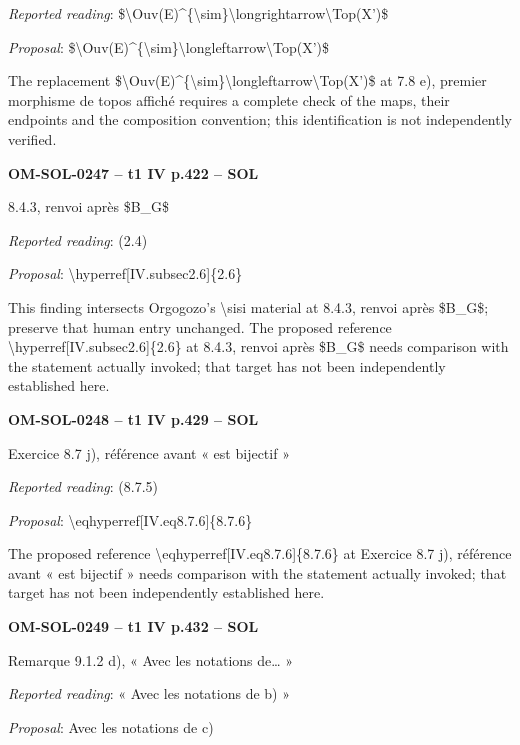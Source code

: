 \emph{Reported reading}: \$\textbackslash{}Ouv(E)\textasciicircum{}\{\textbackslash{}sim\}\textbackslash{}longrightarrow\textbackslash{}Top(X')\$\par
\emph{Proposal}: \$\textbackslash{}Ouv(E)\textasciicircum{}\{\textbackslash{}sim\}\textbackslash{}longleftarrow\textbackslash{}Top(X')\$\par
The replacement \$\textbackslash{}Ouv(E)\textasciicircum{}\{\textbackslash{}sim\}\textbackslash{}longleftarrow\textbackslash{}Top(X')\$ at 7.8 e), premier morphisme de topos affiché requires a complete check of the maps, their endpoints and the composition convention; this identification is not independently verified.\par
\par\noindent\textbf{OM-SOL-0247 -- t1 IV p.422 -- SOL}\par
8.4.3, renvoi après \$B\_G\$\par
\emph{Reported reading}: (2.4)\par
\emph{Proposal}: \textbackslash{}hyperref[IV.subsec2.6]\{2.6\}\par
This finding intersects Orgogozo's \textbackslash{}sisi material at 8.4.3, renvoi après \$B\_G\$; preserve that human entry unchanged. The proposed reference \textbackslash{}hyperref[IV.subsec2.6]\{2.6\} at 8.4.3, renvoi après \$B\_G\$ needs comparison with the statement actually invoked; that target has not been independently established here.\par
\par\noindent\textbf{OM-SOL-0248 -- t1 IV p.429 -- SOL}\par
Exercice 8.7 j), référence avant « est bijectif »\par
\emph{Reported reading}: (8.7.5)\par
\emph{Proposal}: \textbackslash{}eqhyperref[IV.eq8.7.6]\{8.7.6\}\par
The proposed reference \textbackslash{}eqhyperref[IV.eq8.7.6]\{8.7.6\} at Exercice 8.7 j), référence avant « est bijectif » needs comparison with the statement actually invoked; that target has not been independently established here.\par
\par\noindent\textbf{OM-SOL-0249 -- t1 IV p.432 -- SOL}\par
Remarque 9.1.2 d), « Avec les notations de… »\par
\emph{Reported reading}: « Avec les notations de b) »\par
\emph{Proposal}: Avec les notations de c)\par
